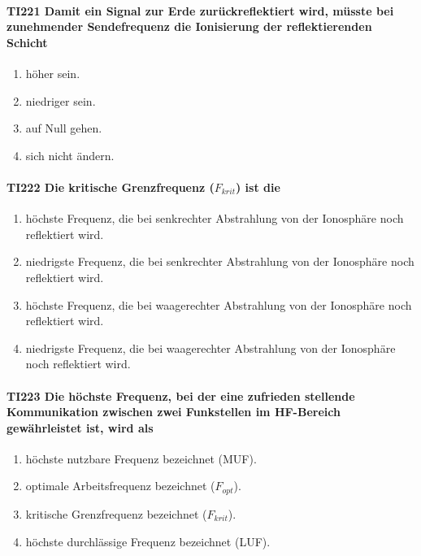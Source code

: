 \documentclass[8pt]{article}
\begin{document}
\paragraph*{TI221 Damit ein Signal zur Erde zurückreflektiert wird, müsste bei zunehmender Sendefrequenz die Ionisierung der reflektierenden Schicht}
\begin{enumerate}[nolistsep,label=\Alph*]
\item höher sein.
\item niedriger sein.
\item auf Null gehen.
\item sich nicht ändern.
\end{enumerate}

\paragraph*{TI222 Die kritische Grenzfrequenz ($F_{krit}$) ist die}
\begin{enumerate}[nolistsep,label=\Alph*]
\item höchste Frequenz, die bei senkrechter Abstrahlung von der Ionosphäre noch reflektiert wird. 
\item niedrigste Frequenz, die bei senkrechter Abstrahlung von der Ionosphäre noch reflektiert wird.
\item höchste Frequenz, die bei waagerechter Abstrahlung von der Ionosphäre noch reflektiert wird.
\item niedrigste Frequenz, die bei waagerechter Abstrahlung von der Ionosphäre noch reflektiert wird.
\end{enumerate}

\paragraph*{TI223 Die höchste Frequenz, bei der eine zufrieden stellende Kommunikation zwischen zwei Funkstellen im HF-Bereich gewährleistet ist, wird als}
\begin{enumerate}[nolistsep,label=\Alph*]
\item höchste nutzbare Frequenz bezeichnet (MUF).
\item optimale Arbeitsfrequenz bezeichnet ($F_{opt}$).
\item kritische Grenzfrequenz bezeichnet ($F_{krit}$).
\item höchste durchlässige Frequenz bezeichnet (LUF).
\end{enumerate}
\end{document}
